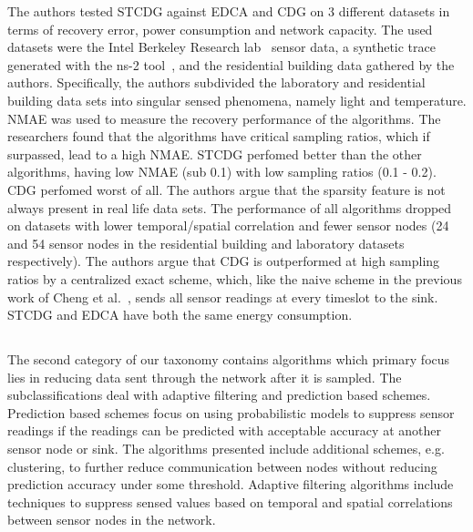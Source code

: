 The authors tested \ac{STCDG} against \ac{EDCA} and \ac{CDG} on 3 different
datasets in terms of recovery error, power consumption and network capacity.
The used datasets were the Intel Berkeley Research lab~\cite{labdata} sensor
data, a synthetic trace generated with the ns-2 tool~\cite{bajaj1999improving},
and the residential building data gathered by the authors. Specifically, the
authors subdivided the laboratory and residential building data sets into
singular sensed phenomena, namely light and temperature. \ac{NMAE} was used to
measure the recovery performance of the algorithms. The researchers found that
the algorithms have critical sampling ratios, which if surpassed, lead to a
high \ac{NMAE}. \ac{STCDG} perfomed better than the other algorithms, having
low \ac{NMAE} (sub 0.1) with low sampling ratios (0.1 - 0.2). \ac{CDG} perfomed
worst of all. The authors argue that the sparsity feature is not always present
in real life data sets. The performance of all algorithms dropped on datasets
with lower temporal/spatial correlation and fewer sensor nodes (24 and 54
sensor nodes in the residential building and laboratory datasets respectively).
The authors argue that \ac{CDG} is outperformed at high sampling ratios by a
centralized exact scheme, which, like the naive scheme in the previous work of
Cheng et al.~\cite{cheng2013stcdg}, sends all sensor readings at every timeslot
to the sink. \ac{STCDG} and \ac{EDCA} have both the same energy consumption.


\subsection{\catII} %
\label{sec:catII}

The second category of our taxonomy contains algorithms which primary focus
lies in reducing data sent through the network after it is sampled. The
subclassifications deal with adaptive filtering and prediction based schemes.
Prediction based schemes focus on using probabilistic models to suppress sensor
readings if the readings can be predicted with acceptable accuracy at another
sensor node or sink. The algorithms presented include additional schemes, e.g.
clustering, to further reduce communication between nodes without reducing
prediction accuracy under some threshold. Adaptive filtering algorithms include
techniques to suppress sensed values based on temporal and spatial correlations
between sensor nodes in the network.



